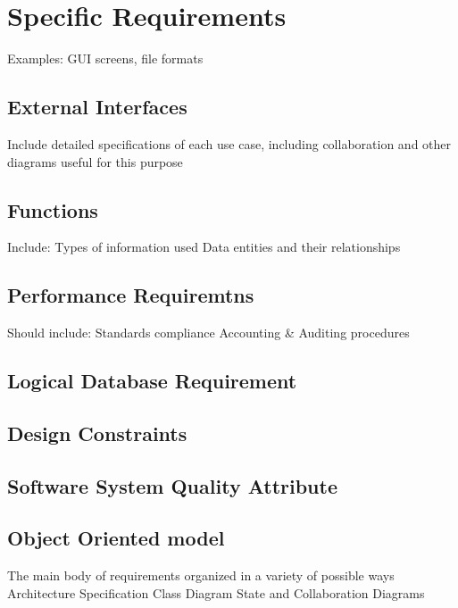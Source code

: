 \documentclass[a4paper,12pt]{scrreprt}
\begin{document}
\chapter{Specific Requirements}
Examples: GUI screens, file formats


\section{External Interfaces}
Include detailed specifications of each use case, including collaboration and other diagrams useful for this purpose


\section{Functions}
Include:
Types of information used
Data entities and their relationships


\section{Performance Requiremtns}
Should include:
Standards compliance
Accounting \& Auditing procedures


\section{Logical Database Requirement}

\section{Design Constraints}

\section{Software System Quality Attribute}

\section{Object Oriented model}
The main body of requirements organized in a variety of possible ways
Architecture Specification
Class Diagram
State and Collaboration Diagrams‏








	
\end{document}
